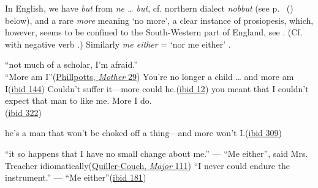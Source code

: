 In English, we have \textit{but} from \textit{ne {\dots} but}, cf. northern dialect \textit{nobbut} (see p.~\pageref{12-nobbut} () below), %
and a rare \textit{more} meaning `no more', a clear instance of prosiopesis, which, however, seems to be confined to the South-Western part of England, see . (Cf. with negative verb .) Similarly \textit{me either} = `nor me either' .

\ea \label{ex:03-22}
\ea
``not much of a scholar, I'm afraid.''\\``More am I''\hfill(\href{https://archive.org/details/themother00phil/page/28/mode/2up?q=%22scholar%22&view=theater}{Phillpotts, \textit{Mother} 29})
\ex
You're no longer a child {\dots} and more am I\hfill(\href{https://archive.org/details/themother00phil/page/144/mode/2up?q=%22You%27re+no+longer+a+child%22&view=theater}{ibid 144})
\ex
Couldn't suffer it---more could he.\hfill(\href{https://archive.org/details/themother00phil/page/12/mode/2up?q=%22Couldn%27t+suffer+it%E2%80%94more+could+he%22&view=theater}{ibid 12})
\ex
you meant that I couldn't expect that man to like me. More I do.\\\hfill(\href{https://archive.org/details/themother00phil/page/322/mode/2up?q=%22you+meant+that+I+couldn%27t+expect+that+man+to+like+me.+More+I+do%22&view=theater}{ibid 322})
\z
\z

\ea \label{ex:03-26}
he's a man that won't be choked off a thing---and more won't I.\hfill(\href{https://archive.org/details/themother00phil/page/308/mode/2up?q=%22he%27s+a+man+that+won%27t+be+choked%22&view=theater}{ibid 309})
\z{}

\noindent 

\ea \label{ex:03-27}
\ea
``it so happens that I have no small change about me.'' --- ``Me either'', said Mrs. Treacher idiomatically\hfill(\href{https://archive.org/details/majorvigoureux00quil/page/110/mode/2up?q=%22Me+either%22&view=theater}{Quiller-Couch, \textit{Major} 111}) %
\ex
``I never could endure the instrument.'' --- ``Me either''\hfill(\href{https://archive.org/details/majorvigoureux00quil/page/180/mode/2up?q=%22Me+either%22&view=theater}{ibid 181}) %
\z
\z{}

